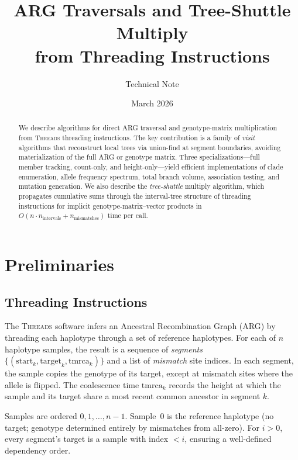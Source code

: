 \documentclass[11pt]{article}
\title{ARG Traversals and Tree-Shuttle Multiply\\from Threading Instructions}
\author{Technical Note}
\date{March 2026}
\begin{document}
\maketitle

\begin{abstract}
We describe algorithms for direct ARG traversal and genotype-matrix
multiplication from \textsc{Threads} threading instructions.  The key
contribution is a family of \emph{visit} algorithms that reconstruct local
trees via union-find at segment boundaries, avoiding materialization of the
full ARG or genotype matrix.  Three specializations---full member tracking,
count-only, and height-only---yield efficient implementations of clade
enumeration, allele frequency spectrum, total branch volume, association
testing, and mutation generation.  We also describe the \emph{tree-shuttle}
multiply algorithm, which propagates cumulative sums through the
interval-tree structure of threading instructions for implicit
genotype-matrix--vector products in $O(n \cdot n_\text{intervals} +
n_\text{mismatches})$ time per call.
\end{abstract}

\section{Preliminaries}

\subsection{Threading Instructions}

The \textsc{Threads} software infers an Ancestral Recombination Graph (ARG)
by threading each haplotype through a set of reference haplotypes.  For each
of $n$ haplotype samples, the result is a sequence of \emph{segments}
$\{(\text{start}_k, \text{target}_k, \text{tmrca}_k)\}$ and a list of
\emph{mismatch} site indices.  In each segment, the sample copies the
genotype of its target, except at mismatch sites where the allele is
flipped.  The coalescence time $\text{tmrca}_k$ records the height at which
the sample and its target share a most recent common ancestor in segment
$k$.

Samples are ordered $0, 1, \ldots, n{-}1$.  Sample~0 is the reference
haplotype (no target; genotype determined entirely by mismatches from
all-zero).  For $i > 0$, every segment's target is a sample with index $<
i$, ensuring a well-defined dependency order.
\end{document}
